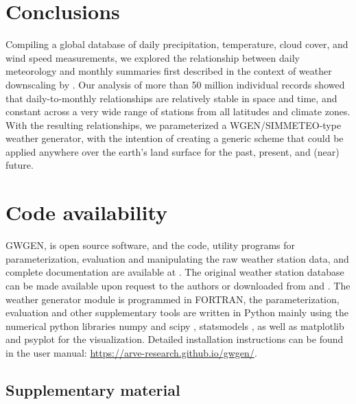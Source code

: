 \begin{refsection}
\section{Conclusions}
Compiling a global database of daily precipitation, temperature, cloud cover, and wind speed measurements, we explored the relationship between daily meteorology and monthly summaries first described in the context of weather downscaling by \cite{GengAuburn1987}. Our analysis of more than 50 million individual records showed that daily-to-monthly relationships are relatively stable in space and time, and constant across a very wide range of stations from all latitudes and climate zones. With the resulting relationships, we parameterized a WGEN/SIMMETEO-type weather generator, with the intention of creating a generic scheme that could be applied anywhere over the earth's land surface for the past, present, and (near) future. 

\section{Code availability} \label{sec:code}
GWGEN, is open source software, and the code, utility programs for parameterization, evaluation and manipulating the raw weather station data, and complete documentation are available at \citep{SommerKaplan2017a}. The original weather station database can be made available upon request to the authors or downloaded from \cite{HahnWarren1999} and \cite{MenneDurreVoseEtAl2012}. The weather generator module is programmed in FORTRAN, the parameterization, evaluation and other supplementary tools are written in Python mainly using the numerical python libraries numpy and scipy \citep{JonesOliphantPetersonEtAl2001}, statsmodels \citep{SeaboldPerktold2010}, as well as matplotlib \citep{Hunter2007} and psyplot \citep{Sommer2017} for the visualization. Detailed installation instructions can be found in the user manual: \url{https://arve-research.github.io/gwgen/}.

\clearpage

\begin{subappendices}
\section{Supplementary material}    %


\end{subappendices}
\end{refsection}
